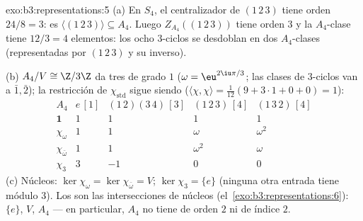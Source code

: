 \begin{solution}{exo:b3:representations:5}
(a) En $S_4$, el centralizador de $(1\,2\,3)$ tiene orden $24/8 =
3$: es $\langle(1\,2\,3)\rangle \subseteq A_4$. Luego
$Z_{A_4}((1\,2\,3))$ tiene orden $3$ y la $A_4$-clase tiene $12/3
= 4$ elementos: los ocho $3$-ciclos se desdoblan en dos $A_4$-clases
(representadas por $(1\,2\,3)$ y su inverso).

(b) $A_4/V \cong \Z/3\Z$ da tres
 de grado $1$
($\omega = \eu^{2\iu\pi/3}$; las clases de $3$-ciclos van a
$\bar1, \bar2$); la restricción de $\chi_{\mathrm{std}}$ sigue siendo
($\langle\chi,\chi\rangle = \frac1{12}(9 + 3
\cdot 1 + 0 + 0) = 1$):
\[
\begin{array}{c|cccc}
A_4 & e\,[1] & (1\,2)(3\,4)\,[3] & (1\,2\,3)\,[4] &
(1\,3\,2)\,[4]\\
\hline
\mathbf 1 & 1 & 1 & 1 & 1\\
\chi_\omega & 1 & 1 & \omega & \omega^2\\
\chi_{\bar\omega} & 1 & 1 & \omega^2 & \omega\\
\chi_3 & 3 & -1 & 0 & 0
\end{array}
\]
(c) Núcleos: $\ker\chi_\omega = \ker\chi_{\bar\omega} = V$;
$\ker\chi_3 = \{e\}$ (ninguna otra entrada tiene módulo $3$). Los
 son las intersecciones
de núcleos (el~\cref{exo:b3:representations:6}): $\{e\}$, $V$, $A_4$ ---
en particular, $A_4$ no tiene  de orden $2$ ni de índice
$2$.
\end{solution}


